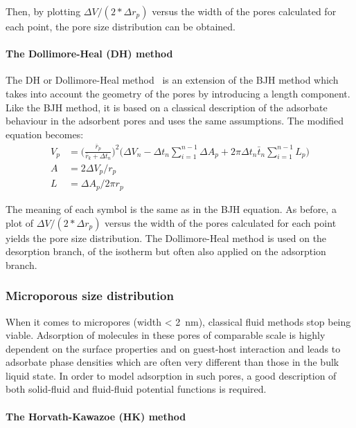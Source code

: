 Then, by plotting \(\Delta V / (2*\Delta r_p)\) versus the width
of the pores calculated for each point, the pore size distribution
can be obtained.

\paragraph{The Dollimore-Heal (DH) method}

The DH or Dollimore-Heal
method~\cite{dollimorePoresizeDistributionTypical1970}
is an extension of the BJH method which takes into account the
geometry of the pores by introducing a length component.
Like the BJH method, it is based on a classical description of
the adsorbate behaviour in the adsorbent pores and uses the
same assumptions. The modified equation becomes:
%
\begin{align}
	V_p & = \Big(\frac{\bar{r}_p}{\bar{r}_k + \Delta t_n}\Big)^2
	\Big(\Delta V_n - \Delta t_n \sum_{i=1}^{n-1} \Delta A_p
	+ 2 \pi \Delta t_n \bar{t}_n \sum_{i=1}^{n-1} L_p\Big)       \\
	A   & = 2 \Delta V_p / r_p                                   \\
	L   & = \Delta A_p / 2 \pi r_p
\end{align}

The meaning of each symbol is the same as in the BJH equation.
As before, a plot of \(\Delta V/(2*\Delta r_p)\) versus the width of
the pores calculated for each point yields the pore size distribution.
The Dollimore-Heal method is used on the desorption branch,
of the isotherm but often also applied on the adsorption branch.

\subsubsection{Microporous size distribution}

When it comes to micropores (width \SI{< 2}{\nano\metre}), classical
fluid methods stop being viable. Adsorption of molecules in these pores
of comparable scale is highly dependent on the surface properties and
on guest-host interaction and leads to adsorbate phase densities
which are often very different than those in the bulk liquid state.
In order to model adsorption in such pores, a good description of
both solid-fluid and fluid-fluid potential functions is required.

\paragraph{The Horvath-Kawazoe (HK) method}

